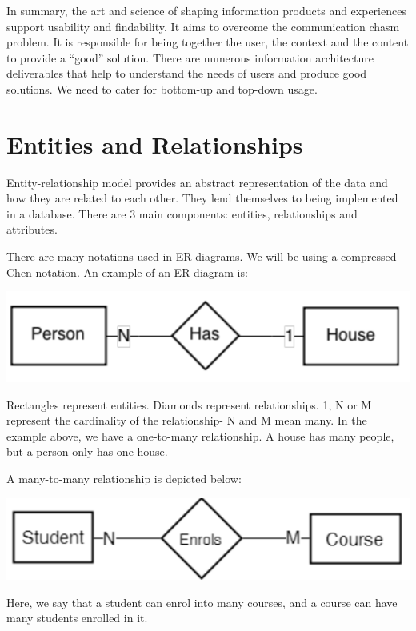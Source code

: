 \documentclass[a4paper, openany]{memoir}
\begin{document}
\noindent In summary, the art and science of shaping information products and experiences support usability and findability. It aims to overcome the communication chasm problem. It is responsible for being together the user, the context and the content to provide a ``good'' solution. There are numerous information architecture deliverables that help to understand the needs of users and produce good solutions. We need to cater for bottom-up and top-down usage.
\newpage

\section{Entities and Relationships}
Entity-relationship model provides an abstract representation of the data and how they are related to each other. They lend themselves to being implemented in a database. There are 3 main components: entities, relationships and attributes.

\noindent There are many notations used in ER diagrams. We will be using a compressed Chen notation. An example of an ER diagram is:
\begin{center}
    \includegraphics[scale=0.8]{src/L10I1.PNG}
\end{center}
Rectangles represent entities. Diamonds represent relationships. 1, N or M represent the cardinality of the relationship- N and M mean many. In the example above, we have a one-to-many relationship. A house has many people, but a person only has one house.

\noindent A many-to-many relationship is depicted below:
\begin{center}
    \includegraphics[scale=0.8]{src/L10I2.PNG}
\end{center}
Here, we say that a student can enrol into many courses, and a course can have many students enrolled in it.
\end{document}
